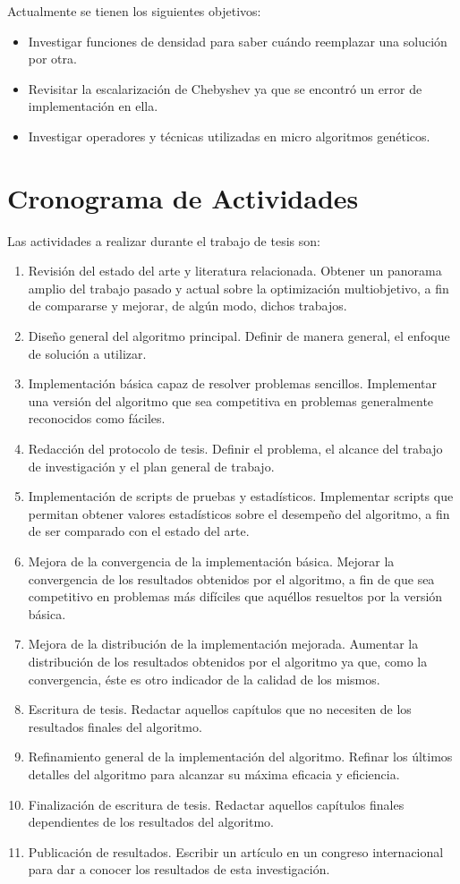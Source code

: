 \documentclass[english]{article}
\begin{document}
Actualmente se tienen los siguientes objetivos:
\begin{itemize}
\item Investigar funciones de densidad para saber cuándo reemplazar una solución por otra.
\item Revisitar la escalarización de Chebyshev ya que se encontró un error de implementación en ella.
\item Investigar operadores y técnicas utilizadas en micro algoritmos genéticos.
\end{itemize}

\section*{Cronograma de Actividades}

Las actividades a realizar durante el trabajo de tesis son:
\begin{enumerate}
\item Revisión del estado del arte y literatura relacionada. Obtener un panorama amplio del trabajo pasado y actual sobre la optimización multiobjetivo, a fin de compararse y mejorar, de algún modo, dichos trabajos.
\item Diseño general del algoritmo principal. Definir de manera general, el enfoque de solución a utilizar.
\item Implementación básica capaz de resolver problemas sencillos. Implementar una versión del algoritmo que sea competitiva en problemas generalmente reconocidos como fáciles.
\item Redacción del protocolo de tesis. Definir el problema, el alcance del trabajo de investigación y el plan general de trabajo.
\item Implementación de scripts de pruebas y estadísticos. Implementar scripts que permitan obtener valores estadísticos sobre el desempeño del algoritmo, a fin de ser comparado con el estado del arte.
\item Mejora de la convergencia de la implementación básica. Mejorar la convergencia de los resultados obtenidos por el algoritmo, a fin de que sea competitivo en problemas más difíciles que aquéllos resueltos por la versión básica.
\item Mejora de la distribución de la implementación mejorada. Aumentar la distribución de los resultados obtenidos por el algoritmo ya que, como la convergencia, éste es otro indicador de la calidad de los mismos.
\item Escritura de tesis. Redactar aquellos capítulos que no necesiten de los resultados finales del algoritmo.
\item Refinamiento general de la implementación del algoritmo. Refinar los últimos detalles del algoritmo para alcanzar su máxima eficacia y eficiencia.
\item Finalización de escritura de tesis. Redactar aquellos capítulos finales dependientes de los resultados del algoritmo.
\item Publicación de resultados. Escribir un artículo en un congreso internacional para dar a conocer los resultados de esta investigación.
\end{enumerate}
\end{document}

